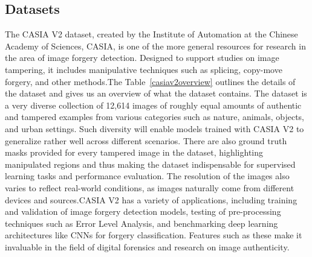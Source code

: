 \documentclass{ieeeaccess}
\begin{document}
\subsection{Datasets}
	The CASIA V2 dataset, created by the Institute of Automation at the Chinese Academy of Sciences, CASIA, is one of the more general resources for research in the area of image forgery detection. Designed to support studies on image tampering, it includes manipulative techniques such as splicing, copy-move forgery, and other methods.The Table~\ref{casiav2overview} outlines the details of the dataset and gives us an overview of what the dataset contains. The dataset is a very diverse collection of 12,614 images of roughly equal amounts of authentic and tampered examples from various categories such as nature, animals, objects, and urban settings. Such diversity will enable models trained with CASIA V2 to generalize rather well across different scenarios. There are also ground truth masks provided for every tampered image in the dataset, highlighting manipulated regions and thus making the dataset indispensable for supervised learning tasks and performance evaluation. The resolution of the images also varies to reflect real-world conditions, as images naturally come from different devices and sources.CASIA V2 has a variety of applications, including training and validation of image forgery detection models, testing of pre-processing techniques such as Error Level Analysis, and benchmarking deep learning architectures like CNNs for forgery classification. Features such as these make it invaluable in the field of digital forensics and research on image authenticity.
\end{document}
